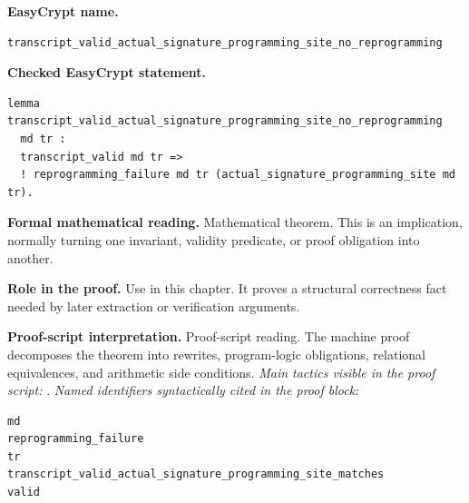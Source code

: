 \begin{formaltheorem}
\noindent\textbf{EasyCrypt name.}
\begin{lstlisting}[language=EasyCrypt,basicstyle=\ttfamily\scriptsize]
transcript_valid_actual_signature_programming_site_no_reprogramming
\end{lstlisting}
\noindent\textbf{Checked EasyCrypt statement.}
\begin{lstlisting}[language=EasyCrypt,basicstyle=\ttfamily\scriptsize]
lemma transcript_valid_actual_signature_programming_site_no_reprogramming
  md tr :
  transcript_valid md tr =>
  ! reprogramming_failure md tr (actual_signature_programming_site md tr).
\end{lstlisting}
\noindent\textbf{Formal mathematical reading.}
Mathematical theorem. This is an implication, normally turning one invariant, validity predicate, or proof obligation into another.

\noindent\textbf{Role in the proof.}
Use in this chapter. It proves a structural correctness fact needed by later extraction or verification arguments.

\noindent\textbf{Proof-script interpretation.}
Proof-script reading. The machine proof decomposes the theorem into rewrites, program-logic obligations, relational equivalences, and arithmetic side conditions.
\emph{Main tactics visible in the proof script:} .
\emph{Named identifiers syntactically cited in the proof block:}
\begin{lstlisting}[language=EasyCrypt,basicstyle=\ttfamily\scriptsize]
md
reprogramming_failure
tr
transcript_valid_actual_signature_programming_site_matches
valid
\end{lstlisting}

\end{formaltheorem}

